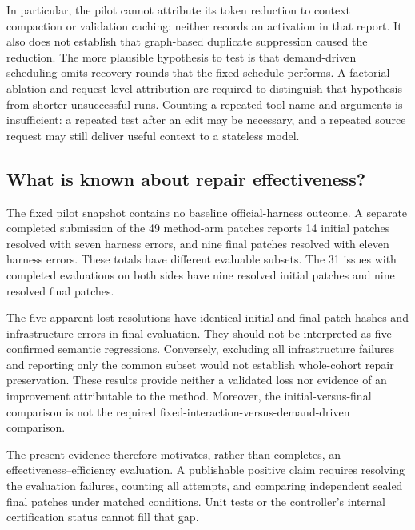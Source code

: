 \documentclass[acmsmall,screen,review,anonymous]{acmart}
\begin{document}
In particular, the pilot cannot attribute its token reduction to context compaction or validation caching: neither records an activation in that report. It also does not establish that graph-based duplicate suppression caused the reduction. The more plausible hypothesis to test is that demand-driven scheduling omits recovery rounds that the fixed schedule performs. A factorial ablation and request-level attribution are required to distinguish that hypothesis from shorter unsuccessful runs. Counting a repeated tool name and arguments is insufficient: a repeated test after an edit may be necessary, and a repeated source request may still deliver useful context to a stateless model.

\subsection{What is known about repair effectiveness?}
The fixed pilot snapshot contains no baseline official-harness outcome. A separate completed submission of the 49 method-arm patches reports 14 initial patches resolved with seven harness errors, and nine final patches resolved with eleven harness errors. These totals have different evaluable subsets. The 31 issues with completed evaluations on both sides have nine resolved initial patches and nine resolved final patches.

The five apparent lost resolutions have identical initial and final patch hashes and infrastructure errors in final evaluation. They should not be interpreted as five confirmed semantic regressions. Conversely, excluding all infrastructure failures and reporting only the common subset would not establish whole-cohort repair preservation. These results provide neither a validated loss nor evidence of an improvement attributable to the method. Moreover, the initial-versus-final comparison is not the required fixed-interaction-versus-demand-driven comparison.

The present evidence therefore motivates, rather than completes, an effectiveness--efficiency evaluation. A publishable positive claim requires resolving the evaluation failures, counting all attempts, and comparing independent sealed final patches under matched conditions. Unit tests or the controller's internal certification status cannot fill that gap.
\end{document}
